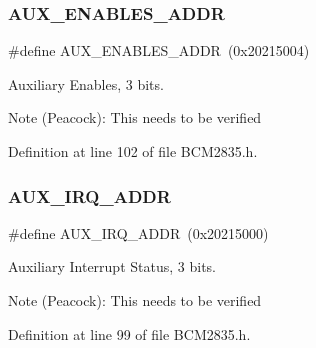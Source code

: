 \subsubsection{\texorpdfstring{A\+U\+X\+\_\+\+E\+N\+A\+B\+L\+E\+S\+\_\+\+A\+D\+DR}{AUX\_ENABLES\_ADDR}}
{\footnotesize\ttfamily \#define A\+U\+X\+\_\+\+E\+N\+A\+B\+L\+E\+S\+\_\+\+A\+D\+DR~(0x20215004)}



Auxiliary Enables, 3 bits. 

\begin{DoxyNote}{Note}
(Peacock)\+: This needs to be verified 
\end{DoxyNote}


Definition at line 102 of file B\+C\+M2835.\+h.

\mbox{\label{group__Auxilliary_ga639b2045d2c60d72ba8e023bcdcf32a1}} 
\subsubsection{\texorpdfstring{A\+U\+X\+\_\+\+I\+R\+Q\+\_\+\+A\+D\+DR}{AUX\_IRQ\_ADDR}}
{\footnotesize\ttfamily \#define A\+U\+X\+\_\+\+I\+R\+Q\+\_\+\+A\+D\+DR~(0x20215000)}



Auxiliary Interrupt Status, 3 bits. 

\begin{DoxyNote}{Note}
(Peacock)\+: This needs to be verified 
\end{DoxyNote}


Definition at line 99 of file B\+C\+M2835.\+h.

